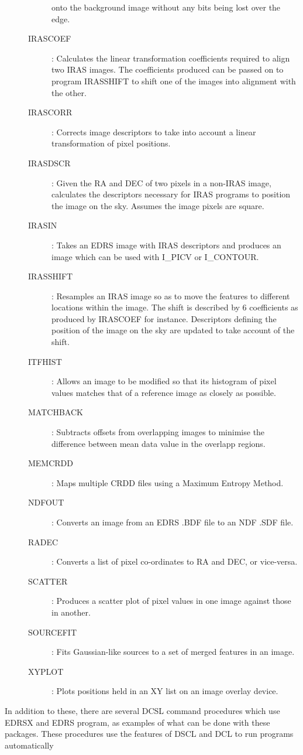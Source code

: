 \begin{description}
\begin{description}
onto the background image without any bits being lost over the edge.
\item[IRASCOEF]: Calculates the linear transformation coefficients required to
align two IRAS images.
The coefficients produced can be passed on to program IRASSHIFT to shift one of
the images into alignment with the other.
\item[IRASCORR]: Corrects image descriptors to take into account a linear
transformation of pixel positions.
\item[IRASDSCR]: Given the RA and DEC of two pixels in a non-IRAS image,
calculates the descriptors necessary for IRAS programs to position the image on
the sky.
Assumes the image pixels are square.
\item[IRASIN]: Takes an EDRS image with IRAS descriptors and produces an image
which can be used with I\_PICV or I\_CONTOUR.
\item[IRASSHIFT]: Resamples an IRAS image so as to move the features to
different locations within the image.
The shift is described by 6 coefficients as produced by IRASCOEF for instance.
Descriptors defining the position of the image on the sky are updated to take
account of the shift.
\item[ITFHIST]: Allows an image to be modified so that its histogram of pixel
values matches that of a reference image as closely as possible.
\item[MATCHBACK]: Subtracts offsets from overlapping images to minimise
the difference between mean data value in the overlapp regions.
\item[MEMCRDD]: Maps multiple CRDD files using a Maximum Entropy Method.
\item[NDFOUT]: Converts an image from an EDRS .BDF file to an NDF .SDF file.
\item[RADEC]: Converts a list of pixel co-ordinates to RA and DEC, or
vice-versa.
\item[SCATTER]: Produces a scatter plot of pixel values in one image
against those in another.
\item[SOURCEFIT]: Fits Gaussian-like sources to a set of merged features in an 
image.
\item[XYPLOT]: Plots positions held in an XY list on an image overlay device.
\end{description}
\end{description}
In addition to these, there are several DCSL command procedures which use EDRSX
and EDRS program, as examples of what can be done with these packages.
These procedures use the features of DSCL and DCL to run programs automatically
